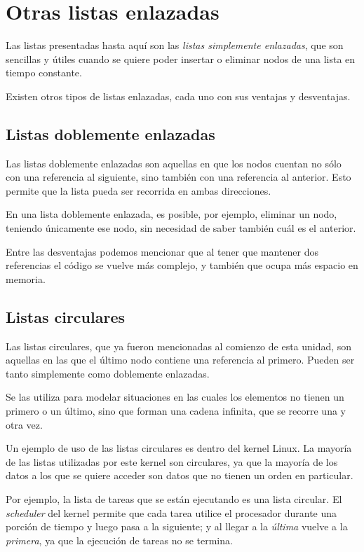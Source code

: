 \section{Otras listas enlazadas}

Las listas presentadas hasta aquí son las {\it listas simplemente
enlazadas}, que son sencillas y útiles cuando se quiere poder insertar o
eliminar nodos de una lista en tiempo constante.

Existen otros tipos de listas enlazadas, cada uno con sus ventajas y
desventajas.

\subsection*{Listas doblemente enlazadas}

Las listas doblemente enlazadas son aquellas en que los nodos cuentan no
sólo con una referencia al siguiente, sino también con una referencia al
anterior.  Esto permite que la lista pueda ser recorrida en ambas
direcciones.

En una lista doblemente enlazada, es posible, por ejemplo, eliminar un
nodo, teniendo únicamente ese nodo, sin necesidad de saber también cuál es
el anterior.

Entre las desventajas podemos mencionar que al tener que mantener dos
referencias el código se vuelve más complejo, y también que ocupa más
espacio en memoria.

\subsection*{Listas circulares}

Las listas circulares, que ya fueron mencionadas al comienzo de esta
unidad, son aquellas en las que el último nodo contiene una referencia al
primero.  Pueden ser tanto simplemente como doblemente enlazadas.

Se las utiliza para modelar situaciones en las cuales los elementos no
tienen un primero o un último, sino que forman una cadena infinita, que se
recorre una y otra vez.

\begin{sabias_que}
Un ejemplo de uso de las listas circulares es dentro del kernel Linux.  La
mayoría de las listas utilizadas por este kernel son circulares, ya que la
mayoría de los datos a los que se quiere acceder son datos que no tienen un
orden en particular.

Por ejemplo, la lista de tareas que se están ejecutando es una lista
circular.  El {\it scheduler} del kernel permite que cada tarea utilice el
procesador durante una porción de tiempo y luego pasa a la siguiente; y al
llegar a la {\it última} vuelve a la {\it primera}, ya que la ejecución de
tareas no se termina.
\end{sabias_que}

